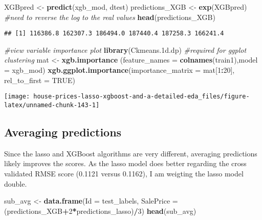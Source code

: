 \documentclass[]{article}
\newenvironment{Shaded}{\begin{snugshade}}{\end{snugshade}}
\newcommand{\KeywordTok}[1]{\textcolor[rgb]{0.13,0.29,0.53}{\textbf{#1}}}
\newcommand{\DataTypeTok}[1]{\textcolor[rgb]{0.13,0.29,0.53}{#1}}
\newcommand{\DecValTok}[1]{\textcolor[rgb]{0.00,0.00,0.81}{#1}}
\newcommand{\StringTok}[1]{\textcolor[rgb]{0.31,0.60,0.02}{#1}}
\newcommand{\CommentTok}[1]{\textcolor[rgb]{0.56,0.35,0.01}{\textit{#1}}}
\newcommand{\OtherTok}[1]{\textcolor[rgb]{0.56,0.35,0.01}{#1}}
\newcommand{\OperatorTok}[1]{\textcolor[rgb]{0.81,0.36,0.00}{\textbf{#1}}}
\newcommand{\NormalTok}[1]{#1}
\begin{document}
\begin{Shaded}
\begin{Highlighting}[]
\NormalTok{XGBpred <-}\StringTok{ }\KeywordTok{predict}\NormalTok{(xgb_mod, dtest)}
\NormalTok{predictions_XGB <-}\StringTok{ }\KeywordTok{exp}\NormalTok{(XGBpred) }\CommentTok{#need to reverse the log to the real values}
\KeywordTok{head}\NormalTok{(predictions_XGB)}
\end{Highlighting}
\end{Shaded}

\begin{verbatim}
## [1] 116386.8 162307.3 186494.0 187440.4 187258.3 166241.4
\end{verbatim}

\begin{Shaded}
\begin{Highlighting}[]
\CommentTok{#view variable importance plot}
\KeywordTok{library}\NormalTok{(Ckmeans.1d.dp) }\CommentTok{#required for ggplot clustering}
\NormalTok{mat <-}\StringTok{ }\KeywordTok{xgb.importance}\NormalTok{ (}\DataTypeTok{feature_names =} \KeywordTok{colnames}\NormalTok{(train1),}\DataTypeTok{model =}\NormalTok{ xgb_mod)}
\KeywordTok{xgb.ggplot.importance}\NormalTok{(}\DataTypeTok{importance_matrix =}\NormalTok{ mat[}\DecValTok{1}\OperatorTok{:}\DecValTok{20}\NormalTok{], }\DataTypeTok{rel_to_first =} \OtherTok{TRUE}\NormalTok{)}
\end{Highlighting}
\end{Shaded}

\texttt{[image: house-prices-lasso-xgboost-and-a-detailed-eda\_files/figure-latex/unnamed-chunk-143-1]}

\subsection{Averaging predictions}\label{averaging-predictions}

Since the lasso and XGBoost algorithms are very different, averaging
predictions likely improves the scores. As the lasso model does better
regarding the cross validated RMSE score (0.1121 versus 0.1162), I am
weigting the lasso model double.

\begin{Shaded}
\begin{Highlighting}[]
\NormalTok{sub_avg <-}\StringTok{ }\KeywordTok{data.frame}\NormalTok{(}\DataTypeTok{Id =}\NormalTok{ test_labels, }\DataTypeTok{SalePrice =}\NormalTok{ (predictions_XGB}\OperatorTok{+}\DecValTok{2}\OperatorTok{*}\NormalTok{predictions_lasso)}\OperatorTok{/}\DecValTok{3}\NormalTok{)}
\KeywordTok{head}\NormalTok{(sub_avg)}
\end{Highlighting}
\end{Shaded}
\end{document}
